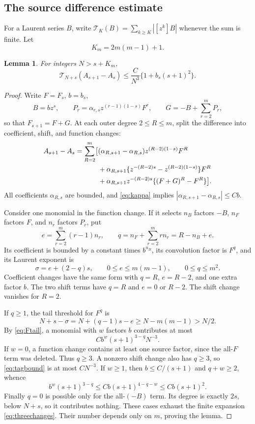 \documentclass[11pt,letterpaper,reqno]{amsart}
\theoremstyle{plain}
\newtheorem{lemma}[theorem]{Lemma}
\newcommand{\tail}[2]{\mathcal T_{#1}(#2)}
\begin{document}
\subsection{The source difference estimate}
For a Laurent series $B$, write $\tail K B=\sum_{k\ge K}|[z^k]B|$ whenever the sum is finite. Let
\[
 K_m=2m(m-1)+1.
\]
\begin{lemma}\label{lem:sourcedifference}
For integers $N>s+K_m$,
\begin{equation}\label{eq:sourcedifference}
 \tail{N+s}{A_{s+1}-A_s}
 \le \frac C{N^3}\{1+b_s(s+1)^2\}.
\end{equation}
\end{lemma}
\begin{proof}
Write $F=F_s$, $b=b_s$,
\[
 B=bz^s,\qquad P_r=\alpha_{r,s}z^{(r-1)(1-s)}F^r,
 \qquad G=-B+\sum_{r=2}^mP_r,
\]
so that $F_{s+1}=F+G$. At each outer degree $2\le R\le m$, split the difference into coefficient, shift, and function changes:
\begin{align}\label{eq:threechanges}
 A_{s+1}-A_s=\sum_{R=2}^m\bigl[&
 (\alpha_{R,s+1}-\alpha_{R,s})z^{(R-2)(1-s)}F^R\notag\\
 &+\alpha_{R,s+1}\{z^{-(R-2)s}-z^{(R-2)(1-s)}\}F^R\notag\\
 &+\alpha_{R,s+1}z^{-(R-2)s}\{(F+G)^R-F^R\}\bigr].
\end{align}
All coefficients $\alpha_{R,s}$ are bounded, and \eqref{eq:kappa} implies
$|\alpha_{R,s+1}-\alpha_{R,s}|\le Cb$.

Consider one monomial in the function change. If it selects $n_B$ factors $-B$, $n_F$ factors $F$, and $n_r$ factors $P_r$, put
\[
 e=\sum_{r=2}^m(r-1)n_r,\qquad
 q=n_F+\sum_{r=2}^m rn_r=R-n_B+e.
\]
Its coefficient is bounded by a constant times $b^{n_B}$, its convolution factor is $F^q$, and its Laurent exponent is
\begin{equation}\label{eq:tag}
 \sigma=e+(2-q)s,\qquad 0\le e\le m(m-1),\qquad 0\le q\le m^2.
\end{equation}
Coefficient changes have the same form with $q=R$, $e=R-2$, and one extra factor $b$. The two shift terms have $q=R$ and $e=0$ or $R-2$. The shift change vanishes for $R=2$.

If $q\ge1$, the tail threshold for $F^q$ is
\[
 N+s-\sigma=N+(q-1)s-e\ge N-m(m-1)>N/2.
\]
By \eqref{eq:Ftail}, a monomial with $w$ factors $b$ contributes at most
\begin{equation}\label{eq:tagbound}
 Cb^w(s+1)^{3-q}N^{-3}.
\end{equation}
If $w=0$, a function change contains at least one source factor, since the all-$F$ term was deleted. Thus $q\ge3$. A nonzero shift change also has $q\ge3$, so \eqref{eq:tagbound} is at most $CN^{-3}$. If $w\ge1$, then $b\le C/(s+1)$ and $q+w\ge2$, whence
\[
 b^w(s+1)^{3-q}\le Cb(s+1)^{4-q-w}\le Cb(s+1)^2.
\]
Finally $q=0$ is possible only for the all-$(-B)$ term. Its degree is exactly $2s$, below $N+s$, so it contributes nothing. These cases exhaust the finite expansion \eqref{eq:threechanges}. Their number depends only on $m$, proving the lemma. 
\end{proof}
\end{document}
